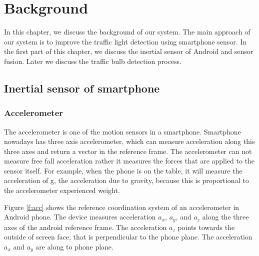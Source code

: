 \chapter{Background}
\label{c:background}
In this chapter, we discuss the background of our system.
The main approach of our system is to improve the traffic light detection using smartphone sensor.
In the first part of this chapter, we discuss the inertial sensor of Android and sensor fusion.
Later we discuss the traffic bulb detection process.

\section{Inertial sensor of smartphone}
\subsection{Accelerometer}
The accelerometer is one of the motion sensors in a smartphone.
Smartphone nowadays has three axis accelerometer, which can measure acceleration along this three axes and return a vector in the reference frame.
The accelerometer can not measure free fall acceleration rather it measures the forces that are applied to the sensor itself.
For example, when the phone is on the table, it will measure the acceleration of g, the acceleration due to gravity, because this is proportional to the accelerometer experienced weight.

Figure \ref{f:acc} shows the reference coordination system of an accelerometer in Android phone.
The device measures acceleration $a_x$, $a_y$, and $a_z$ along the three axes of the android reference frame.
The acceleration $a_z$ points towards the outside of screen face, that is perpendicular to the phone plane.
The acceleration $a_x$ and $a_y$ are along to phone plane.

